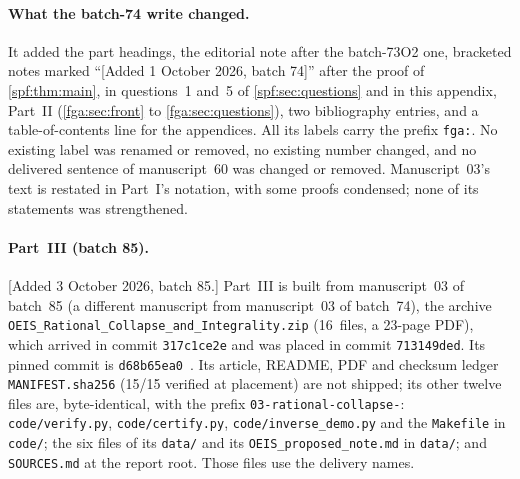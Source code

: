\documentclass[11pt]{article}
\numberwithin{equation}{section}
\theoremstyle{definition}
\theoremstyle{remark}
\theoremstyle{definition}
\begin{document}
\paragraph{What the batch-74 write changed.} It added the part headings,
the editorial note after the batch-73O2 one, bracketed notes marked
``[Added 1 October 2026, batch 74]'' after the proof of \cref{spf:thm:main},
in questions~1 and~5 of \cref{spf:sec:questions} and in this appendix,
Part~II (\cref{fga:sec:front} to \cref{fga:sec:questions}), two bibliography
entries, and a table-of-contents line for the appendices. All its labels
carry the prefix \texttt{fga:}. No existing label was renamed or removed,
no existing number changed, and no delivered sentence of manuscript~60 was
changed or removed. Manuscript~03's text is restated in Part~I's notation,
with some proofs condensed; none of its statements was strengthened.

\paragraph{Part~III (batch 85).}
[Added 3 October 2026, batch 85.] Part~III is built from manuscript~03 of
batch~85 (a different manuscript from manuscript~03 of batch~74), the
archive \nolinkurl{OEIS_Rational_Collapse_and_Integrality.zip} (16~files,
a 23-page PDF), which arrived in commit \texttt{317c1ce2e} and was placed
in commit \texttt{713149ded}. Its pinned commit is
\texttt{d68b65ea0}~\cite{rcProveIt}. Its article, README, PDF and checksum
ledger \texttt{MANIFEST.sha256} (15/15 verified at placement) are not
shipped; its other twelve files are, byte-identical, with the prefix
\texttt{03-rational-collapse-}: \texttt{code/verify.py},
\texttt{code/certify.py}, \texttt{code/inverse\_demo.py} and the
\texttt{Makefile} in \texttt{code/}; the six files of its \texttt{data/} and
its \texttt{OEIS\_proposed\_note.md} in \texttt{data/}; and
\texttt{SOURCES.md} at the report root. Those files use the delivery names.
\end{document}
